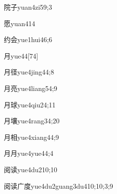 \begin{verbete}{院子}{yuan4zi5}{9;3}
\end{verbete}

\begin{verbete}{愿}{yuan4}{14}
\end{verbete}

\begin{verbete}{约会}{yue1hui4}{6;6}
\end{verbete}

\begin{verbete}{月}{yue4}{4}[74]
\end{verbete}

\begin{verbete}{月径}{yue4jing4}{4;8}
\end{verbete}

\begin{verbete}{月亮}{yue4liang5}{4;9}
\end{verbete}

\begin{verbete}{月球}{yue4qiu2}{4;11}
\end{verbete}

\begin{verbete}{月壤}{yue4rang3}{4;20}
\end{verbete}

\begin{verbete}{月相}{yue4xiang4}{4;9}
\end{verbete}

\begin{verbete}{月月}{yue4yue4}{4;4}
\end{verbete}

\begin{verbete}{阅读}{yue4du2}{10;10}
\end{verbete}

\begin{verbete}{阅读广度}{yue4du2guang3du4}{10;10;3;9}
\end{verbete}

